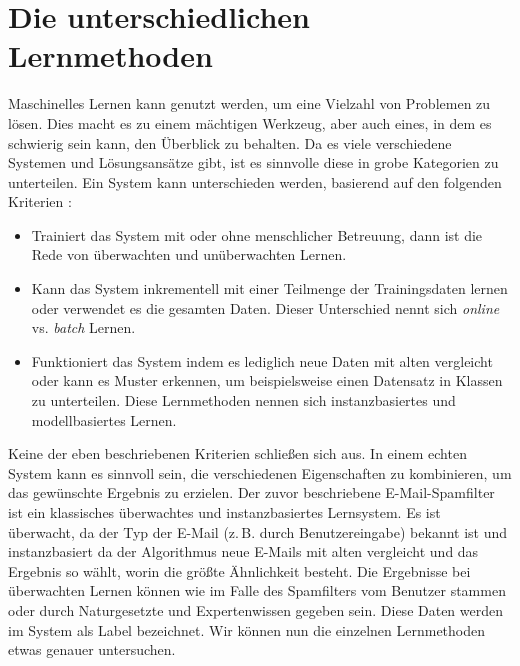 \section{Die unterschiedlichen Lernmethoden}
Maschinelles Lernen kann genutzt werden, um eine Vielzahl von Problemen zu lösen.
Dies macht es zu einem mächtigen Werkzeug, aber auch eines, in dem es schwierig sein
kann, den Überblick zu behalten.
Da es viele verschiedene Systemen und Lösungsansätze gibt, ist es sinnvolle
diese in grobe Kategorien zu unterteilen.
Ein System kann unterschieden werden, basierend auf den folgenden
Kriterien \parencite[7]{book:hands-on-ml}:
\begin{itemize}
  \item Trainiert das System mit oder ohne menschlicher Betreuung, dann ist
        die Rede von überwachten und unüberwachten Lernen.
  \item Kann das System inkrementell mit einer Teilmenge der Trainingsdaten
        lernen oder verwendet es die gesamten Daten. Dieser Unterschied
        nennt sich \textit{online} vs. \textit{batch} Lernen.
  \item Funktioniert das System indem es lediglich neue Daten mit
        alten vergleicht oder kann es Muster erkennen, um beispielsweise
        einen Datensatz in Klassen zu unterteilen.
        Diese Lernmethoden nennen sich instanzbasiertes und modellbasiertes Lernen.
\end{itemize}
Keine der eben beschriebenen Kriterien schließen sich aus.
In einem echten System kann es sinnvoll sein, die verschiedenen
Eigenschaften zu kombinieren, um das gewünschte Ergebnis
zu erzielen. Der zuvor beschriebene E-Mail-Spamfilter
ist ein klassisches überwachtes und instanzbasiertes Lernsystem.
Es ist überwacht, da der Typ der E-Mail (z.\,B. durch Benutzereingabe)
bekannt ist und instanzbasiert da
der Algorithmus neue E-Mails mit alten vergleicht und das
Ergebnis so wählt, worin die größte Ähnlichkeit besteht.
Die Ergebnisse bei überwachten Lernen können wie im Falle des
Spamfilters vom Benutzer stammen oder durch Naturgesetzte und Expertenwissen
gegeben sein. Diese Daten werden im System als Label bezeichnet.
Wir können nun die einzelnen Lernmethoden etwas genauer untersuchen.

